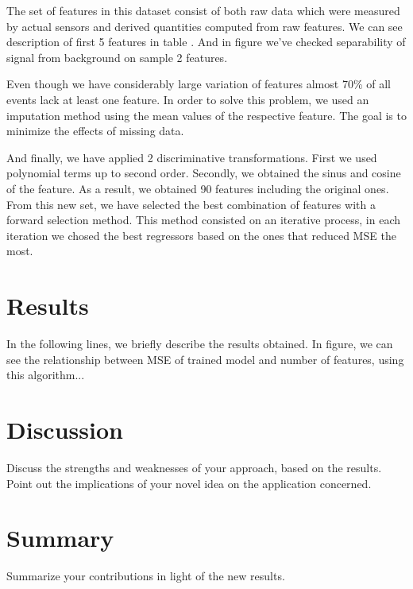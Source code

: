 \documentclass[10pt,conference,compsocconf]{IEEEtran}
\begin{document}
The set of features in this dataset consist of both raw data which were measured by actual sensors and derived quantities computed from raw features. We can see description of first 5 features in table {}. And in figure {} we've checked separability of signal from background on sample 2 features. 

Even though we have considerably large variation of features almost 70\% of all events lack at least one feature. In order to solve this problem, we used an imputation method using the mean values of the respective feature. The goal is to minimize the effects of missing data. 

And finally, we have applied 2 discriminative transformations. First we used polynomial terms up to second order. Secondly, we obtained the sinus and cosine of the feature. As a result, we obtained 90 features including the original ones. From this new set, we have selected the best combination of features with a forward selection method. This method consisted on an iterative process, in each iteration we chosed the best regressors based on the ones that reduced MSE the most. 


\section{Results}
\label{S1}
In the following lines, we briefly describe the results obtained. In figure{}, we can see the relationship between MSE of trained model and number of features, using this algorithm...
\section{Discussion}
\label{S1}
  Discuss the strengths and weaknesses of your
approach, based on the results. Point out the implications of your
novel idea on the application concerned.
\section{Summary}
\label{S1}
  Summarize your contributions in light of the new
results.
\end{document}
